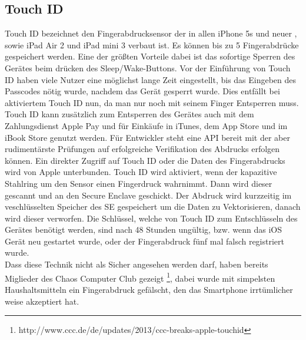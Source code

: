 	\subsection{Touch ID}\label{sec:touch_id}
		Touch ID bezeichnet den Fingerabdrucksensor der in allen iPhone 5s und neuer
		, sowie iPad Air 2 und iPad mini 3 verbaut ist. Es können bis zu 5
		Fingerabdrücke gespeichert werden. Eine der größten Vorteile dabei ist das
		sofortige Sperren des Gerätes beim drücken des Sleep/Wake-Buttons. Vor der
		Einführung von Touch ID haben viele Nutzer eine möglichst lange Zeit
		eingestellt, bis das Eingeben des Passcodes nötig wurde, nachdem das Gerät
		gesperrt wurde. Dies entfällt bei aktiviertem Touch ID nun, da man nur noch
		mit seinem Finger Entsperren muss. Touch ID kann zusätzlich zum
		Entsperren des Gerätes auch mit dem Zahlungsdienst Apple Pay und für Einkäufe
		in iTunes, dem App Store und im iBook Store genutzt werden. Für Entwickler
		steht eine API bereit mit der aber rudimentärste Prüfungen auf erfolgreiche
		Verifikation des Abdrucks erfolgen können. Ein direkter Zugriff auf Touch ID
		oder die Daten des Fingerabdrucks wird von Apple unterbunden. Touch ID wird
		aktiviert, wenn der kapazitive Stahlring um den Sensor einen Fingerdruck
		wahrnimmt. Dann wird dieser gescannt und an den Secure Enclave geschickt. Der
		Abdruck wird kurzzeitig im veschlüsselten Speicher des SE gespeichert um die
		Daten zu Vektorisieren, danach wird dieser verworfen. Die Schlüssel, welche
		von Touch ID zum Entschlüsseln des Gerätes benötigt werden, sind nach 48
		Stunden ungültig, bzw. wenn das iOS Gerät neu gestartet wurde, oder der
		Fingerabdruck fünf mal falsch registriert wurde.\\
		Dass diese Technik nicht als Sicher angesehen werden darf, haben bereits
		Miglieder des Chaos Computer Club gezeigt
		\footnote{http://www.ccc.de/de/updates/2013/ccc-breaks-apple-touchid}, dabei 
		wurde mit simpelsten Haushaltsmitteln ein Fingerabdruck gefälscht, den das
		Smartphone irrtümlicher weise akzeptiert hat.

